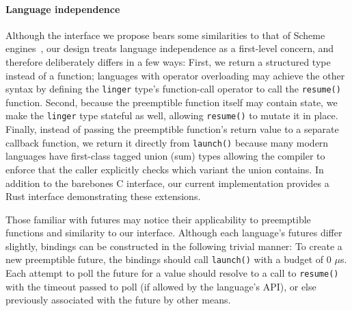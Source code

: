 \paragraph{Language independence}
Although the interface we propose bears some similarities to that of Scheme
engines~\cite{haynes:iucs1984}, our design treats language independence as a
first-level concern, and therefore deliberately differs in a few ways:  First, we
return a structured type instead of a function; languages with operator overloading
may achieve the other syntax by defining the \texttt{linger} type's function-call
operator to call the \texttt{resume()} function.  Second, because the preemptible
function itself may contain state, we make the \texttt{linger} type stateful as well,
allowing \texttt{resume()} to mutate it in place.  Finally, instead of passing the
preemptible function's return value to a separate callback function, we return it
directly from \texttt{launch()} because many modern languages have first-class tagged
union (sum) types allowing the compiler to enforce that the caller explicitly checks
which variant the union contains.  In addition to the barebones C interface, our
current implementation provides a Rust interface demonstrating these extensions.

\vspace{\parsep}
Those familiar with futures may notice their applicability to preemptible functions
and similarity to our interface.  Although each language's futures differ slightly,
bindings can be constructed in the following trivial manner:
To create a new preemptible future, the bindings should call \texttt{launch()} with a
budget of 0 $\mu$s.  Each attempt to poll the future for a value should resolve to a
call to \texttt{resume()} with the timeout passed to poll (if allowed by the
language's API), or else previously associated with the future by other means.
